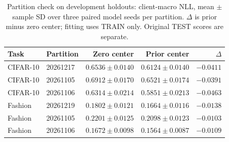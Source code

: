 \begin{table}[t]
\centering
\scriptsize
\caption{Partition check on development holdouts: client-macro NLL, mean $\pm$ sample SD over three paired model seeds per partition. $\Delta$ is prior minus zero center; fitting uses TRAIN only. Original TEST scores are separate.}
\label{tab:partitiondev}
\begin{tabular}{llrrr}
\toprule
Task & Partition & Zero center & Prior center & $\Delta$ \\
\midrule
CIFAR-10 & 20261217 & $0.6536\pm0.0140$ & $0.6124\pm0.0140$ & $-0.0411$ \\
CIFAR-10 & 20261105 & $0.6912\pm0.0170$ & $0.6521\pm0.0174$ & $-0.0391$ \\
CIFAR-10 & 20261106 & $0.6314\pm0.0214$ & $0.5851\pm0.0213$ & $-0.0463$ \\
Fashion & 20261219 & $0.1802\pm0.0121$ & $0.1664\pm0.0116$ & $-0.0138$ \\
Fashion & 20261105 & $0.2201\pm0.0125$ & $0.2098\pm0.0123$ & $-0.0103$ \\
Fashion & 20261106 & $0.1672\pm0.0098$ & $0.1564\pm0.0087$ & $-0.0109$ \\
\bottomrule
\end{tabular}
\end{table}
